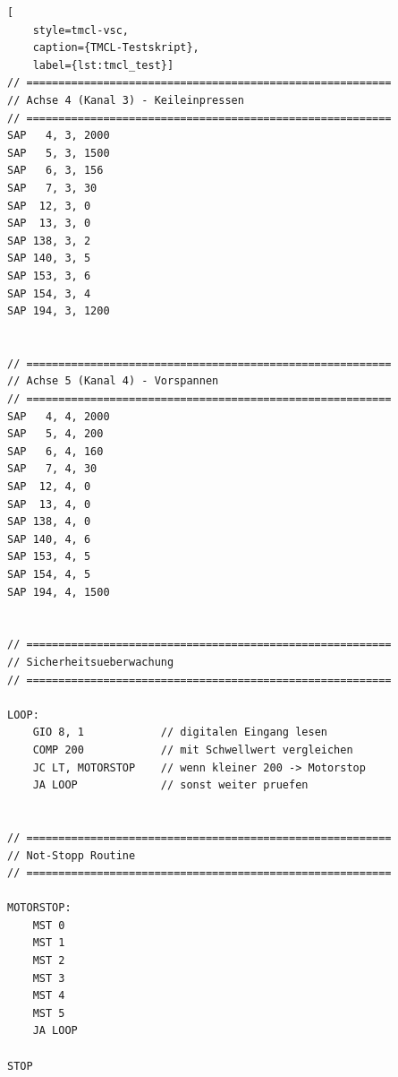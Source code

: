 \begin{lstlisting}[
    style=tmcl-vsc,
    caption={TMCL-Testskript},
    label={lst:tmcl_test}]
// =========================================================
// Achse 4 (Kanal 3) - Keileinpressen
// =========================================================
SAP   4, 3, 2000
SAP   5, 3, 1500
SAP   6, 3, 156
SAP   7, 3, 30
SAP  12, 3, 0
SAP  13, 3, 0
SAP 138, 3, 2
SAP 140, 3, 5
SAP 153, 3, 6
SAP 154, 3, 4
SAP 194, 3, 1200


// =========================================================
// Achse 5 (Kanal 4) - Vorspannen
// =========================================================
SAP   4, 4, 2000
SAP   5, 4, 200
SAP   6, 4, 160
SAP   7, 4, 30
SAP  12, 4, 0
SAP  13, 4, 0
SAP 138, 4, 0
SAP 140, 4, 6
SAP 153, 4, 5
SAP 154, 4, 5
SAP 194, 4, 1500


// =========================================================
// Sicherheitsueberwachung
// =========================================================

LOOP:
    GIO 8, 1            // digitalen Eingang lesen
    COMP 200            // mit Schwellwert vergleichen
    JC LT, MOTORSTOP    // wenn kleiner 200 -> Motorstop
    JA LOOP             // sonst weiter pruefen


// =========================================================
// Not-Stopp Routine
// =========================================================

MOTORSTOP:
    MST 0
    MST 1
    MST 2
    MST 3
    MST 4
    MST 5
    JA LOOP

STOP
\end{lstlisting}